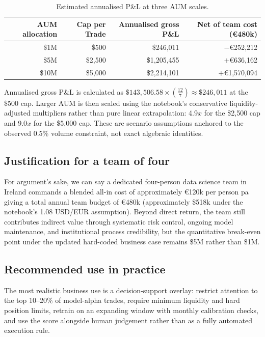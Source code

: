 \documentclass[11pt,a4paper]{article}
\newcommand{\edit}[1]{#1}
\newcommand{\GrossPnlSevenMonths}{\edit{143,506.58}}
\newcommand{\AnnualPnlOneM}{\edit{246,011}}
\newcommand{\AnnualPnlFiveM}{\edit{1,205,455}}
\newcommand{\AnnualPnlTenM}{\edit{2,214,101}}
\newcommand{\NetTeamOneM}{\edit{252,212}}
\newcommand{\NetTeamFiveM}{\edit{636,162}}
\newcommand{\NetTeamTenM}{\edit{1,570,094}}
\newcommand{\FiveMScale}{\edit{4.9}}
\newcommand{\TenMScale}{\edit{9.0}}
\begin{document}
\begin{table}[H]
\centering
\small
\begin{tabular}{rrrr}
\toprule
AUM allocation & Cap per Trade&Annualised gross P\&L & Net of team cost (\euro{}480k) \\
\midrule
\$1M & \$500  & \$\AnnualPnlOneM & $-$\euro{}\NetTeamOneM \\
\$5M & \$2{,}500 & \$\AnnualPnlFiveM & $+$\euro{}\NetTeamFiveM \\
\$10M & \$5{,}000 & \$\AnnualPnlTenM & $+$\euro{}\NetTeamTenM \\
\bottomrule
\end{tabular}
\caption{Estimated annualised P\&L at three AUM scales.}
\label{tab:aum}
\end{table}

\edit{Annualised gross P\&L is calculated as $\$\GrossPnlSevenMonths \times (\frac{12}{7}) \approx \$\AnnualPnlOneM$ at the \$500 cap. Larger AUM is then scaled using the notebook's conservative liquidity-adjusted multipliers rather than pure linear extrapolation: \FiveMScale$x$ for the \$2{,}500 cap and \TenMScale$x$ for the \$5{,}000 cap. These are scenario assumptions anchored to the observed 0.5\% volume constraint, not exact algebraic identities.}

\subsection{Justification for a team of four}

\edit{For argument's sake, we can say a dedicated four-person data science team in Ireland commands a blended all-in cost of approximately \euro{}120k per person pa giving a total annual team budget of \euro{}480k (approximately \$518k under the notebook's 1.08 USD/EUR assumption). Beyond direct return, the team still contributes indirect value through systematic risk control, ongoing model maintenance, and institutional process credibility, but the quantitative break-even point under the updated hard-coded business case remains \$5M rather than \$1M.}

\subsection{Recommended use in practice}

The most realistic business use is a decision-support overlay: restrict attention to the top 10--20\% of model-alpha trades, require minimum liquidity and hard position limits, retrain on an expanding window with monthly calibration checks, and use the score alongside human judgement rather than as a fully automated execution rule.
\end{document}
